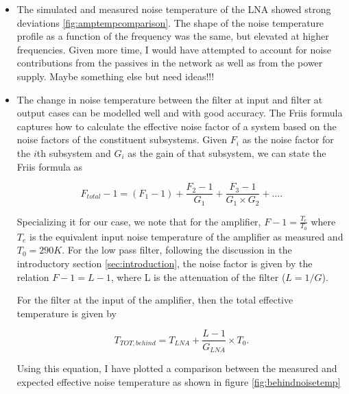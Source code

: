 \documentclass[twocolumn, aps, apl]{revtex4-1}
\begin{document}
\begin{itemize}
    \item The simulated and measured noise temperature of the LNA showed strong deviations \ref{fig:amptempcomparison}. The shape of the noise temperature profile as a function of the frequency was the same, but elevated at higher frequencies. Given more time, I would have attempted to account for noise contributions from the passives in the network as well as from the power supply. Maybe something else but need ideas!!!

    \item The change in noise temperature between the filter at input and filter at output cases can be modelled well and with good accuracy. The Friis formula captures how to calculate the effective noise factor of a system based on the noise factors of the constituent subsystems. Given $F_i$ as the noise factor for the $i$th subsystem and $G_i$ as the gain of that subsystem, we can state the Friis formula as

    \begin{equation}
        F_{total} - 1 = (F_1 - 1) + \frac{F_2 - 1}{G_1} + \frac{F_3 - 1}{G_1 \times G_2} + \ldots.  
    \end{equation} 

    Specializing it for our case, we note that for the amplifier, $F - 1 = \frac{T_e}{T_0}$ where $T_e$ is the equivalent input noise temperature of the amplifier as measured and $T_0 = 290 K$. For the low pass filter, following the discussion in the introductory section \ref{sec:introduction}, the noise factor is given by the relation $F - 1 = L - 1$, where L is the attenuation of the filter ($L = 1/G$).

    For the filter at the input of the amplifier, then the total effective temperature is given by

    \begin{equation}
        T_{TOT, behind} = T_{LNA} + \frac{L - 1}{G_{LNA}} \times T_0.
    \end{equation}

    Using this equation, I have plotted a comparison between the measured and expected effective noise temperature as shown in figure \ref{fig:behindnoisetemp}
    

\end{itemize}
\end{document}
